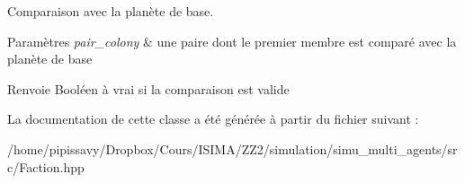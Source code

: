 Comparaison avec la planète de base. 


\begin{DoxyParams}{Paramètres}
{\em pair\-\_\-colony} & une paire dont le premier membre est comparé avec la planète de base \\
\hline
\end{DoxyParams}
\begin{DoxyReturn}{Renvoie}
Booléen à vrai si la comparaison est valide 
\end{DoxyReturn}


La documentation de cette classe a été générée à partir du fichier suivant \-:\begin{DoxyCompactItemize}
\item 
/home/pipissavy/\-Dropbox/\-Cours/\-I\-S\-I\-M\-A/\-Z\-Z2/simulation/simu\-\_\-multi\-\_\-agents/src/Faction.\-hpp\end{DoxyCompactItemize}
